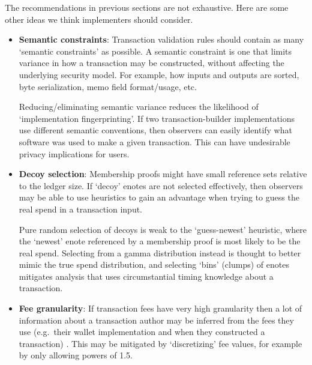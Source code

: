 The recommendations in previous sections are not exhaustive. Here are some other ideas we think implementers should consider.

\begin{itemize}
    \item \textbf{Semantic constraints}: Transaction validation rules should contain as many `semantic constraints' as possible. A semantic constraint is one that limits variance in how a transaction may be constructed, without affecting the underlying security model. For example, how inputs and outputs are sorted, byte serialization, memo field format/usage, etc.

    Reducing/eliminating semantic variance reduces the likelihood of `implementation fingerprinting'. If two transaction-builder implementations use different semantic conventions, then observers can easily identify what software was used to make a given transaction. This can have undesirable privacy implications for users.

    \item \textbf{Decoy selection}: Membership proofs might have small reference sets relative to the ledger size. If `decoy' enotes are not selected effectively, then observers may be able to use heuristics to gain an advantage when trying to guess the real spend in a transaction input.

    Pure random selection of decoys is weak to the `guess-newest' heuristic, where the `newest' enote referenced by a membership proof is most likely to be the real spend. Selecting from a gamma distribution instead is thought to better mimic the true spend distribution, and selecting `bins' (clumps) of enotes mitigates analysis that uses circumstantial timing knowledge about a transaction. \cite{AnalysisOfLinkability, foundations-ring-sampling}

    \item \textbf{Fee granularity}: If transaction fees have very high granularity then a lot of information about a transaction author may be inferred from the fees they use (e.g.\ their wallet implementation and when they constructed a transaction) \cite{visualizing-monero-vid}. This may be mitigated by `discretizing' fee values, for example by only allowing powers of 1.5.
\end{itemize}
